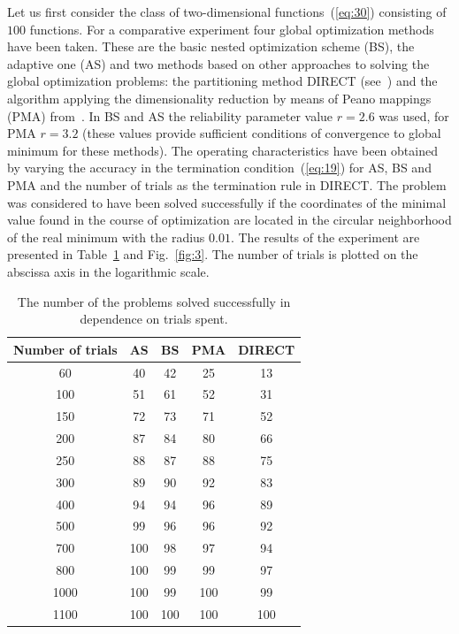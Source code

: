 \documentclass[smallextended]{svjour3}
\let\origref\ref
\renewcommand{\ref}[1]{(\origref{#1})}
\begin{document}
Let us first consider the class of two-dimensional functions~\ref{eq:30} consisting of $100$ functions. For a comparative experiment four global optimization methods have been taken. These are the basic nested optimization scheme (BS), the adaptive one (AS) and two methods based on other approaches to solving the global optimization problems: the partitioning method DIRECT (see~\cite{Ref17}) and the algorithm applying the dimensionality reduction by means of Peano mappings (PMA) from~\cite{Ref36}. In BS and AS the reliability parameter value $r = 2.6$ was used, for PMA $r = 3.2$ (these values provide sufficient conditions of convergence to global minimum for these methods). The operating characteristics have been obtained by varying the accuracy in the termination condition~\ref{eq:19} for AS, BS and PMA and the number of trials as the termination rule in DIRECT. The problem was considered to have been solved successfully if the coordinates of the minimal value found in the course of optimization are located in the circular neighborhood of the real minimum with the radius $0.01$. The results of the experiment are presented in Table~\origref{tab:1} and Fig.~\origref{fig:3}. The number of trials is plotted on the abscissa axis in the logarithmic scale.

\begin{table}[H]
\centering
\caption{\label{tab:1}The number of the problems solved successfully in dependence on trials spent.}
\begin{tabular}{|c|c|c|c|c|}
  \hline
  Number of trials &  AS &  BS & PMA & DIRECT \\ \hline
  60               &  40 &  42 &  25 & 13     \\ \hline
  100              &  51 &  61 &  52 & 31     \\ \hline
  150              &  72 &  73 &  71 & 52     \\ \hline
  200              &  87 &  84 &  80 & 66     \\ \hline
  250              &  88 &  87 &  88 & 75     \\ \hline
  300              &  89 &  90 &  92 & 83     \\ \hline
  400              &  94 &  94 &  96 & 89     \\ \hline
  500              &  99 &  96 &  96 & 92     \\ \hline
  700              & 100 &  98 &  97 & 94     \\ \hline
  800              & 100 &  99 &  99 & 97     \\ \hline
  1000             & 100 &  99 & 100 & 99     \\ \hline
  1100             & 100 & 100 & 100 & 100    \\ \hline
\end{tabular}
\end{table}
\end{document}

